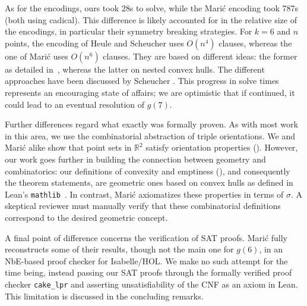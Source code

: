 As for the encodings,
ours took 28s to solve,
while the Marić encoding took 787s (both using \textsf{cadical}).
This difference is likely accounted for in the relative size of the encodings,
in particular their symmetry breaking strategies.
For $k=6$ and $n$ points,
the encoding of Heule and Scheucher uses $O(n^4)$ clauses,
whereas the one of Marić uses $O(n^6)$ clauses.
They are based on different ideas:
the former as detailed in~,
whereas the latter on nested convex hulls.
The different approaches have been discussed by Scheucher \cite{scheucherTwoDisjoint5holes2020}.
This progress in solve times
represents an encouraging state of affairs;
we are optimistic that if continued,
it could lead to an eventual resolution of $g(7)$.

Further differences regard what exactly was formally proven.
As with most work in this area,
we use the combinatorial abstraction of triple orientations.
We and Marić alike show that point sets in $\mathbb R^2$
satisfy orientation properties ().
However, our work goes further in building the connection
between geometry and combinatorics:
our definitions of convexity and emptiness (),
and consequently the theorem statements,
are geometric ones based on convex hulls
as defined in Lean's \texttt{mathlib}~\cite{The_mathlib_Community_2020}.
In contrast, Marić axiomatizes these properties in terms of $\sigma$.
A skeptical reviewer must manually verify that these combinatorial definitions
correspond to the desired geometric concept.

A final point of difference concerns the verification of SAT proofs.
Marić fully reconstructs some of their results,
though not the main one for $g(6)$,
in an NbE-based proof checker for Isabelle/HOL.
We make no such attempt for the time being,
instead passing our SAT proofs through the
formally verified proof checker \texttt{cake\_lpr} \cite{tanVerifiedPropagationRedundancy2023}
and asserting unsatisfiability of the CNF as an axiom in Lean.
This limitation is discussed in the concluding remarks.
